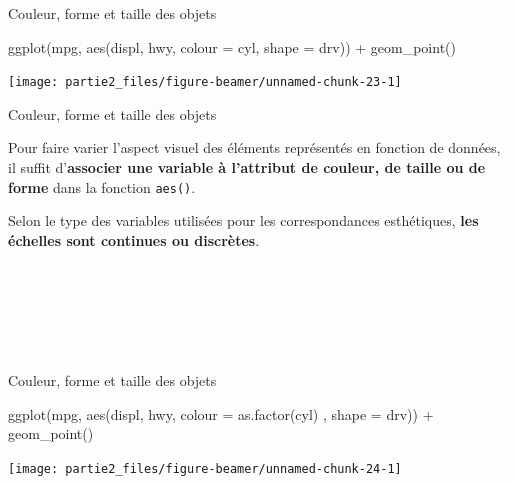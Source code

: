 \documentclass[12pt,ignorenonframetext,]{beamer}
\newenvironment{Shaded}{}{}
\newcommand{\KeywordTok}[1]{\textcolor[rgb]{0.00,0.00,1.00}{#1}}
\newcommand{\DataTypeTok}[1]{#1}
\newcommand{\StringTok}[1]{\textcolor[rgb]{0.00,0.50,0.50}{#1}}
\newcommand{\OperatorTok}[1]{#1}
\newcommand{\NormalTok}[1]{#1}
\renewenvironment{Shaded}{\begin{snugshade}}{\end{snugshade}}
\begin{document}
\begin{frame}[fragile]{Couleur, forme et taille des objets}

\footnotesize \center

\begin{Shaded}
\begin{Highlighting}[]
\KeywordTok{ggplot}\NormalTok{(mpg, }\KeywordTok{aes}\NormalTok{(displ, hwy, }\DataTypeTok{colour =}\NormalTok{ cyl, }\DataTypeTok{shape =}\NormalTok{ drv)) }\OperatorTok{+}
\StringTok{  }\KeywordTok{geom_point}\NormalTok{()}
\end{Highlighting}
\end{Shaded}

\texttt{[image: partie2\_files/figure-beamer/unnamed-chunk-23-1]}

\end{frame}

\begin{frame}{Couleur, forme et taille des objets}

Pour faire varier l'aspect visuel des éléments représentés en fonction
de données, il suffit
d'\textbf{associer une variable à l'attribut de couleur, de taille ou de forme}
dans la fonction \texttt{aes()}.

Selon le type des variables utilisées pour les correspondances
esthétiques, \textbf{les échelles sont continues ou discrètes}.

\textcolor{white}{Quand la même variable est utilisée dans plusieurs correspondances esthétiques, \textbf{les échelles qui lui correspondent sont fusionnées}.}

\textcolor{white}{Au-delà des correspondances esthétiques dans la fonction \texttt{aes()}, \textbf{l'aspect visuel peut être ajusté directement dans la fonction \texttt{geom\_*}}.}

\end{frame}

\begin{frame}[fragile]{Couleur, forme et taille des objets}

\footnotesize \center

\begin{Shaded}
\begin{Highlighting}[]
\KeywordTok{ggplot}\NormalTok{(mpg, }\KeywordTok{aes}\NormalTok{(displ, hwy, }\DataTypeTok{colour =} \KeywordTok{as.factor}\NormalTok{(cyl)}
\NormalTok{  , }\DataTypeTok{shape =}\NormalTok{ drv)) }\OperatorTok{+}
\StringTok{  }\KeywordTok{geom_point}\NormalTok{()}
\end{Highlighting}
\end{Shaded}

\texttt{[image: partie2\_files/figure-beamer/unnamed-chunk-24-1]}

\end{frame}
\end{document}
